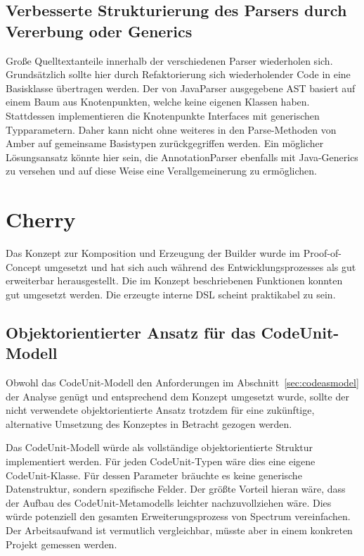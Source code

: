 \documentclass[12pt,oneside,a4paper,parskip]{scrbook}
\begin{document}
\subsection{Verbesserte Strukturierung des Parsers durch Vererbung oder Generics}

Große Quelltextanteile innerhalb der verschiedenen Parser wiederholen sich. Grundsätzlich sollte hier durch Refaktorierung sich wiederholender Code in eine Basisklasse übertragen werden. Der von JavaParser ausgegebene AST basiert auf einem Baum aus Knotenpunkten, welche keine eigenen Klassen haben. Stattdessen implementieren die Knotenpunkte Interfaces mit generischen Typparametern. Daher kann nicht ohne weiteres in den Parse-Methoden von Amber auf gemeinsame Basistypen zurückgegriffen werden. Ein möglicher Lösungsansatz könnte hier sein, die AnnotationParser ebenfalls mit Java-Generics zu versehen und auf diese Weise eine Verallgemeinerung zu ermöglichen.

\section{Cherry}

Das Konzept zur Komposition und Erzeugung der Builder wurde im Proof-of-Concept umgesetzt und hat sich auch während des Entwicklungsprozesses als gut erweiterbar herausgestellt. Die im Konzept beschriebenen Funktionen konnten gut umgesetzt werden. Die erzeugte interne DSL scheint praktikabel zu sein.

\subsection{Objektorientierter Ansatz für das CodeUnit-Modell}

Obwohl das CodeUnit-Modell den Anforderungen im Abschnitt~\ref{sec:codeasmodel} der Analyse genügt und entsprechend dem Konzept umgesetzt wurde, sollte der nicht verwendete objektorientierte Ansatz trotzdem für eine zukünftige, alternative Umsetzung des Konzeptes in Betracht gezogen werden.

Das CodeUnit-Modell würde als vollständige objektorientierte Struktur implementiert werden. Für jeden CodeUnit-Typen wäre dies eine eigene CodeUnit-Klasse. Für dessen Parameter bräuchte es keine generische Datenstruktur, sondern spezifische Felder. Der größte Vorteil hieran wäre, dass der Aufbau des CodeUnit-Metamodells leichter nachzuvollziehen wäre. Dies würde potenziell den gesamten Erweiterungsprozess von Spectrum vereinfachen. Der Arbeitsaufwand ist vermutlich vergleichbar, müsste aber in einem konkreten Projekt gemessen werden.
\end{document}
